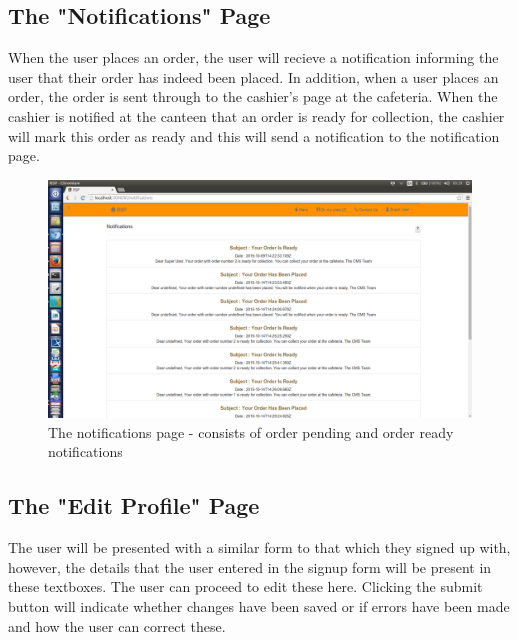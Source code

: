 \documentclass[a4paper,12pt]{report}
\begin{document}
\subsection{The "Notifications" Page} 
When the user places an order, the user will recieve a notification informing the user that their order has indeed been placed. In addition, when a user places an order, the order is sent through to the cashier's page at the cafeteria. When the cashier is notified at the canteen that an order is ready for collection, the cashier will mark this order as ready and this will send a notification to the notification page.

\begin{figure}[H]
  \centering
    \includegraphics[width=1.0\textwidth]{screenshots/notifications.png}
    \caption{The notifications page -  consists of order pending and order ready notifications} 
\end{figure}


\subsection{The "Edit Profile" Page} 
The user will be presented with a similar form to that which they signed up with, however, the details that the user entered in the signup form will be present in these textboxes. The user can proceed to edit these here. Clicking the submit button will indicate whether changes have been saved or if errors have been made and how the user can correct these.
\end{document}
